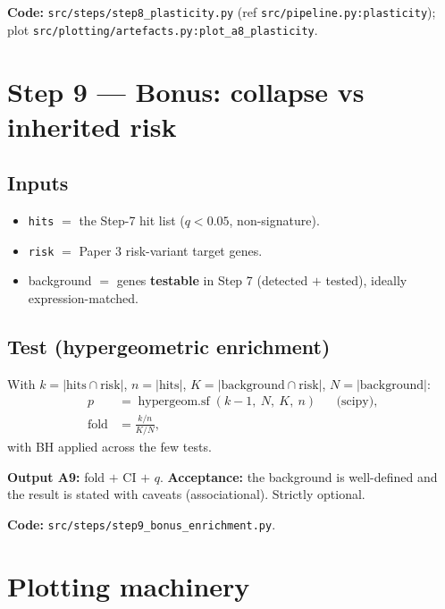 \documentclass[11pt]{article}
\newcommand{\code}[1]{\texttt{\small #1}}
\begin{document}
\medskip
\noindent\textbf{Code:} \code{src/steps/step8\_plasticity.py} (ref \code{src/pipeline.py:plasticity});
plot \code{src/plotting/artefacts.py:plot\_a8\_plasticity}.

\section{Step 9 --- Bonus: collapse vs inherited risk}

\subsection{Inputs}
\begin{itemize}[leftmargin=1.4em]
  \item \code{hits} $=$ the Step-7 hit list ($q < 0.05$, non-signature).
  \item \code{risk} $=$ Paper 3 risk-variant target genes.
  \item background $=$ genes \textbf{testable} in Step 7 (detected $+$ tested), ideally
        expression-matched.
\end{itemize}

\subsection{Test (hypergeometric enrichment)}
With $k = |\text{hits} \cap \text{risk}|$, $n = |\text{hits}|$,
$K = |\text{background} \cap \text{risk}|$, $N = |\text{background}|$:
\begin{align}
  p    &= \operatorname{hypergeom.sf}(k-1,\ N,\ K,\ n) && \text{(scipy)}, \\
  \text{fold} &= \frac{k/n}{K/N},
\end{align}
with BH applied across the few tests.

\textbf{Output A9:} fold $+$ CI $+$ $q$. \textbf{Acceptance:} the background is well-defined and the
result is stated with caveats (associational). Strictly optional.

\medskip
\noindent\textbf{Code:} \code{src/steps/step9\_bonus\_enrichment.py}.

\section{Plotting machinery}
\end{document}
